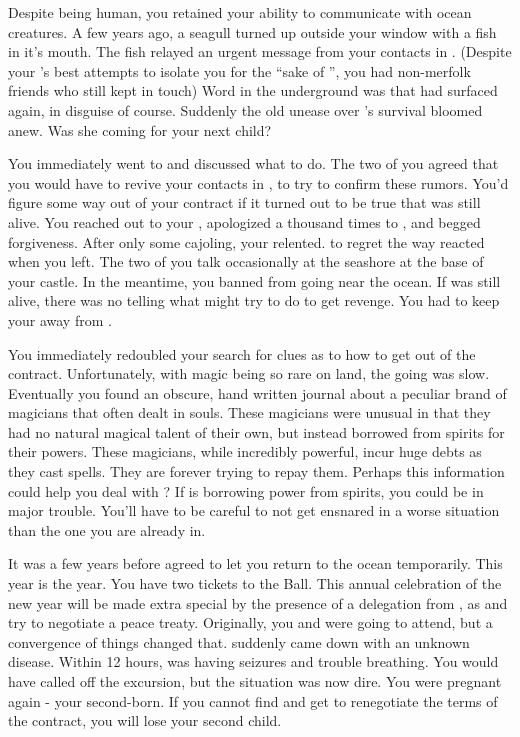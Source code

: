 \documentclass[char]{NeptuneBall}
\begin{document}
Despite being human, you retained your ability to communicate with ocean creatures. A few years ago, a seagull turned up outside your window with a fish in it's mouth. The fish relayed an urgent message from your contacts in \pAtlantis{}. (Despite your \cKing{\parent}'s best attempts to isolate you for the ``sake of \pAtlantis{}'', you had non-merfolk friends who still kept in touch) Word in the underground was that \cWitch{} had surfaced again, in disguise of course.  Suddenly the old unease over \cWitch{}'s survival bloomed anew. Was she coming for your next child? 

You immediately went to \cEric{} and discussed what to do. The two of you agreed that you would have to revive your contacts in \pAtlantis{}, to try to confirm these rumors. You'd figure some way out of your contract if it turned out to be true that \cWitch{} was still alive. You reached out to your \cKing{\parent}, apologized a thousand times to \cKing{\them}, and begged \cKing{\their} forgiveness. After only some cajoling, your \cKing{\parent} relented. \cKing{\They}  to regret the way \cKing{\they} reacted when you left. The two of you talk occasionally at the seashore at the base of your castle.  In the meantime, you banned \cWillow{} from going near the ocean. If \cWitch{} was still alive, there was no telling what \cWitch{\they} might try to do to get revenge. You had to keep your \cWillow{\offspring} away from \cWitch{}.

You immediately redoubled your search for clues as to how to get out of the contract. Unfortunately, with magic being so rare on land, the going was slow. Eventually you found an obscure, hand written journal about a peculiar brand of magicians that often dealt in souls. These magicians were unusual in that they had no natural magical talent of their own, but instead borrowed from spirits for their powers. These magicians, while incredibly powerful, incur huge debts as they cast spells. They are forever trying to repay them. Perhaps this information could help you deal with \cWitch{}? If \cWitch{} is borrowing power from spirits, you could be in major trouble. You'll have to be careful to not get ensnared in a worse situation than the one you are already in.

It was a few years before \cKing{\King} \cKing{} agreed to let you return to the ocean temporarily. This year is the year. You have two tickets to the \cExExKing{} Ball. This annual celebration of the new year will be made extra special by the presence of a delegation from \pPacifica{}, as \pAtlantis{} and \pPacifica{} try to negotiate a peace treaty. Originally, you and \cEric{} were going to attend, but a convergence of things changed that. \cEric{} suddenly came down with an unknown disease. Within 12 hours, \cEric{} was having seizures and trouble breathing. You would have called off the excursion, but the situation was now dire. You were pregnant again - your second-born. If you cannot find \cWitch{} and get \cWitch{\them} to renegotiate the terms of the contract, you will lose your second child.
\end{document}
